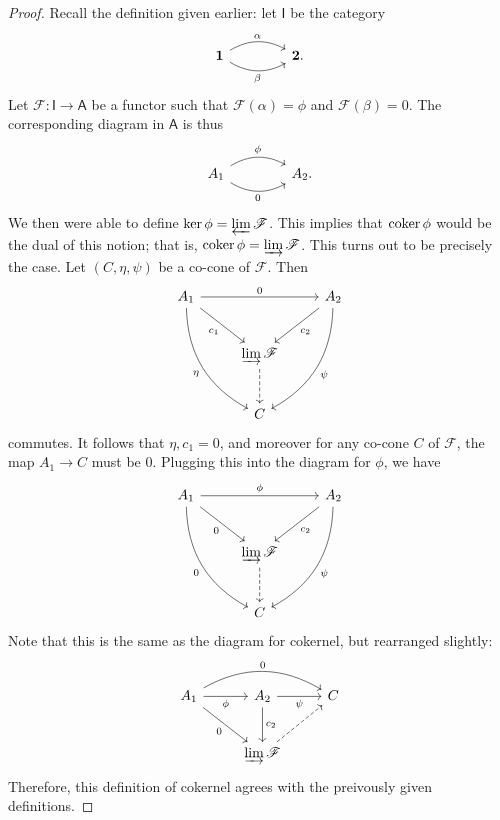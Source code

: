 \documentclass[11pt]{report}
\begin{document}
\begin{proof}
	Recall the definition given earlier: let $\mathsf{I} $ be the category
	\[\begin{tikzcd}[row sep = 2.5em, column sep = 4em]
		\mathbf{1} \arrow[r, bend left, "\alpha "]\arrow[r, bend right, "\beta "']&\mathbf{2}.
	\end{tikzcd}\]
	Let $\mathscr{F} : \mathsf{I}  \to \mathsf{A} $ be a functor such that $\mathscr{F} (\alpha )=\phi $ and $\mathscr{F} (\beta )=0$. The corresponding diagram in $\mathsf{A} $ is thus
	\[\begin{tikzcd}[row sep = 2.5em, column sep = 4em]
		A_1\arrow[r, bend left, "\phi "]\arrow[r, bend right, "0"']&A_2.
	\end{tikzcd}\]
	We then were able to define $\ker \phi =\varprojlim \mathscr{F} $. This implies that $\operatorname{coker} \phi $ would be the dual of this notion; that is, $\operatorname{coker} \phi =\varinjlim \mathscr{F} $. This turns out to be precisely the case. Let $(C,\eta ,\psi )$ be a co-cone of $\mathscr{F} $. Then
	\[\begin{tikzcd}[row sep = 2.5em, column sep = 2.5em]
		A_1\arrow[dr, "c_1"']\arrow[ddr, bend right, "\eta "']\arrow[rr, "0"]&&A_2\arrow[dl, "c_2"]\arrow[ddl, bend left, "\psi "]\\
										   &\varinjlim \mathscr{F} \arrow[d, dashed]\\
										   &C
	\end{tikzcd}\]
	commutes. It follows that $\eta ,c_1=0$, and moreover for any co-cone $C$ of $\mathscr{F} $, the map $A_1\to C$ must be $0$. Plugging this into the diagram for $\phi $, we have
	\[\begin{tikzcd}[row sep = 2.5em, column sep = 2.5em]
		A_1\arrow[dr, "0"']\arrow[ddr, bend right, "0"']\arrow[rr, "\phi "]&&A_2\arrow[dl, "c_2"]\arrow[ddl, bend left, "\psi "]\\
										   &\varinjlim \mathscr{F} \arrow[d, dashed]\\
										   &C
	\end{tikzcd}\]
	Note that this is the same as the diagram for cokernel, but rearranged slightly:
	\[\begin{tikzcd}[row sep = 2.5em, column sep = 2.5em]
		A_1\arrow[rr, bend left, "0"]\arrow[r, "\phi "']\arrow[dr, "0"']&A_2\arrow[r, "\psi "']\arrow[d, "c_2"]&C\\
									      &\varinjlim \mathscr{F} \arrow[ur, dashed]
	\end{tikzcd}\]
	Therefore, this definition of cokernel agrees with the preivously given definitions.
\end{proof}
\end{document}
